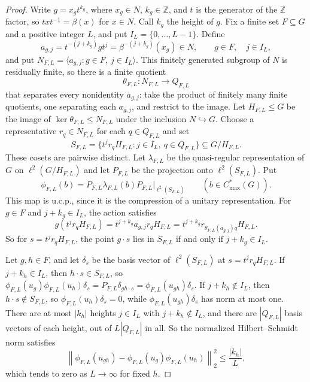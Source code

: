 \documentclass[11pt]{amsart}
\theoremstyle{plain}
\newcommand{\hsnorm}[1]{\left\lVert #1\right\rVert_2}
\begin{document}
\begin{proof}
Write $g=x_gt^{k_g}$, where $x_g\in N$, $k_g\in\mathbb Z$, and
$t$ is the generator of the $\mathbb Z$ factor, so $txt^{-1}=\beta(x)$
for $x\in N$.  Call $k_g$ the height
of $g$.  Fix a finite set $F\subseteq G$ and a positive integer $L$, and
put $I_L=\{0,\ldots,L-1\}$.  Define
\[
 a_{g,j}=t^{-(j+k_g)}gt^j=\beta^{-(j+k_g)}(x_g)\in N,
 \qquad g\in F,\quad j\in I_L,
\]
and put $N_{F,L}=\langle a_{g,j}:g\in F,\ j\in I_L\rangle$.
This finitely generated subgroup of $N$ is residually finite, so there
is a finite quotient
\[
 \theta_{F,L}\colon N_{F,L}\longrightarrow Q_{F,L}
\]
that separates every nonidentity $a_{g,j}$: take the product of
finitely many finite quotients, one separating each $a_{g,j}$, and
restrict to the image.  Let
$H_{F,L}\leq G$ be the image of $\ker\theta_{F,L}\leq N_{F,L}$ under the
inclusion $N\hookrightarrow G$.  Choose a representative $r_q\in N_{F,L}$
for each $q\in Q_{F,L}$ and set
\[
 S_{F,L}=\{t^jr_qH_{F,L}:j\in I_L,\ q\in Q_{F,L}\}
 \subseteq G/H_{F,L}.
\]
These cosets are pairwise distinct.  Let $\lambda_{F,L}$ be the
quasi-regular representation of $G$ on $\ell^2(G/H_{F,L})$ and let
$P_{F,L}$ be the projection onto $\ell^2(S_{F,L})$.  Put
\[
 \phi_{F,L}(b)=P_{F,L}\lambda_{F,L}(b)P_{F,L}\big|_{\ell^2(S_{F,L})}
 \qquad(b\in C^*_{\max}(G)).
\]
This map is u.c.p., since it is the compression of a unitary
representation.
For $g\in F$ and $j+k_g\in I_L$, the action satisfies
\[
 g(t^jr_qH_{F,L})
 =t^{j+k_g}a_{g,j}r_qH_{F,L}
 =t^{j+k_g}r_{\theta_{F,L}(a_{g,j})q}H_{F,L}.
\]
So for $s=t^jr_qH_{F,L}$, the point $g\cdot s$ lies in $S_{F,L}$ if and
only if $j+k_g\in I_L$.

Let $g,h\in F$, and let $\delta_s$ be the basis vector of
$\ell^2(S_{F,L})$ at $s=t^jr_qH_{F,L}$.  If $j+k_h\in I_L$, then
$h\cdot s\in S_{F,L}$, so
$\phi_{F,L}(u_g)\phi_{F,L}(u_h)\delta_s=P_{F,L}\delta_{gh\cdot s}
=\phi_{F,L}(u_{gh})\delta_s$.  If $j+k_h\notin I_L$, then
$h\cdot s\notin S_{F,L}$, so $\phi_{F,L}(u_h)\delta_s=0$, while
$\phi_{F,L}(u_{gh})\delta_s$ has norm at most one.  There are at most
$|k_h|$ heights $j\in I_L$ with $j+k_h\notin I_L$, and there are
$|Q_{F,L}|$ basis vectors of each height, out of $L|Q_{F,L}|$ in all.
So the normalized Hilbert--Schmidt norm satisfies
\[
 \hsnorm{\phi_{F,L}(u_{gh})-
   \phi_{F,L}(u_g)\phi_{F,L}(u_h)}^2
 \leq \frac{|k_h|}{L},
\]
which tends to zero as $L\to\infty$ for fixed $h$.


\end{proof}
\end{document}
